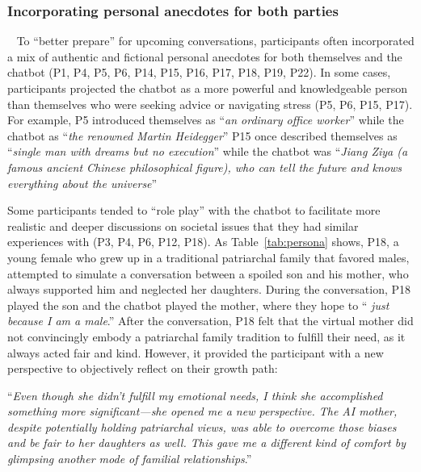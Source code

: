 \subsubsection{Incorporating personal anecdotes for both parties}~\label{ancedotes}
To ``better prepare'' for upcoming conversations, participants often incorporated a mix of authentic and fictional personal anecdotes for both themselves and the chatbot (P1, P4, P5, P6, P14, P15, P16, P17, P18, P19, P22).
In some cases, participants projected the chatbot as a more powerful and knowledgeable person than themselves who were seeking advice or navigating stress (P5, P6, P15, P17). For example, P5 introduced themselves as ``\textit{an ordinary office worker}'' while the chatbot as ``\textit{the renowned Martin Heidegger}''  P15 once described themselves as ``\textit{single man with dreams but no execution}'' while the chatbot was ``\textit{Jiang Ziya (a famous ancient Chinese philosophical figure), who can tell the future and knows everything about the universe}'' 

Some participants tended to ``role play'' with the chatbot to facilitate more realistic and deeper discussions on societal issues that they had similar experiences with (P3, P4, P6, P12, P18). As Table~\ref{tab:persona} shows, P18, a young female who grew up in a traditional patriarchal family that favored males, attempted to simulate a conversation between a spoiled son and his mother, who always supported him and neglected her daughters. During the conversation, P18 played the son and the chatbot played the mother, where they hope to  ``\textit{ just because I am a male}.'' 
After the conversation, P18 felt that the virtual mother did not convincingly embody a patriarchal family tradition to fulfill their need, as it always acted fair and kind. However, it provided the participant with a new perspective to objectively reflect on their growth path:

``\textit{Even though she didn't fulfill my emotional needs, I think she accomplished something more significant---she opened me a new perspective. The AI mother, despite potentially holding patriarchal views, was able to overcome those biases and be fair to her daughters as well. This gave me a different kind of comfort by glimpsing another mode of familial relationships}.''



